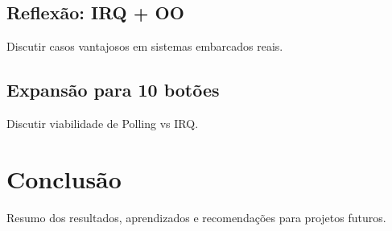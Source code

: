 \documentclass{article}
\begin{document}
\subsection{Reflexão: IRQ + OO}
Discutir casos vantajosos em sistemas embarcados reais.  

\subsection{Expansão para 10 botões}
Discutir viabilidade de Polling vs IRQ.  

\section{Conclusão}
Resumo dos resultados, aprendizados e recomendações para projetos futuros.  
\end{document}
